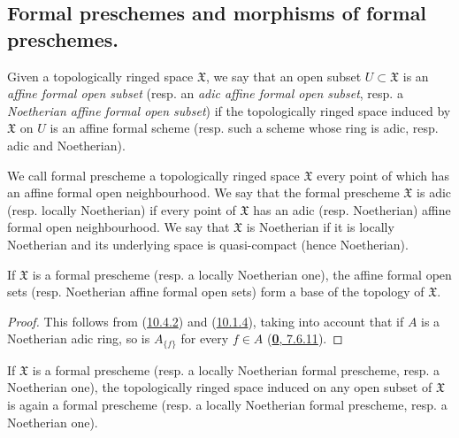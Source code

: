 \subsection{Formal preschemes and morphisms of formal preschemes.}
\label{subsection:I.10.4}

\begin{env}[10.4.1]
\label{I.10.4.1}
Given a topologically ringed space $\mathfrak{X}$, we say that an
open subset $U\subset\mathfrak{X}$ is an \emph{affine formal open subset}
(resp. an \emph{adic affine formal open subset}, resp. a \emph{Noetherian
affine formal open subset}) if the topologically ringed space induced by
$\mathfrak{X}$ on $U$ is an affine formal scheme (resp. such a scheme whose
ring is adic, resp. adic and Noetherian).
\end{env}

\begin{definition}[10.4.2]
\label{I.10.4.2}
We call formal prescheme a topologically ringed space $\mathfrak{X}$
every point of which has an affine formal open neighbourhood. We say that
the formal prescheme $\mathfrak{X}$ is adic (resp. locally Noetherian) if
every point of $\mathfrak{X}$ has an adic (resp. Noetherian) affine formal
open neighbourhood. We say that $\mathfrak{X}$ is Noetherian if it is
locally Noetherian and its underlying space is quasi-compact (hence
Noetherian).
\end{definition}

\begin{proposition}[10.4.3]
\label{I.10.4.3}
If $\mathfrak{X}$ is a formal prescheme \textup{(resp.} a locally Noetherian one),
the affine formal open sets \textup{(resp.} Noetherian affine formal open sets) form
a base of the topology of $\mathfrak{X}$.
\end{proposition}

\begin{proof}
This follows from (\hyperref[I.10.4.2]{10.4.2}) and
(\hyperref[I.10.1.4]{10.1.4}), taking into account that if $A$ is a
Noetherian adic ring, so is $A_{\{f\}}$ for every
$f\in A$ (\hyperref[0.7.6.11]{\textbf{0}, 7.6.11}).
\end{proof}

\begin{corollary}[10.4.4]
\label{I.10.4.4}
If $\mathfrak{X}$ is a formal prescheme \textup{(resp.} a locally Noetherian formal
prescheme, \textup{resp.} a Noetherian one), the topologically ringed space
induced on any open subset of $\mathfrak{X}$ is again a formal prescheme
\textup{(resp.} a locally Noetherian formal prescheme, \textup{resp.} a Noetherian one).
\end{corollary}

